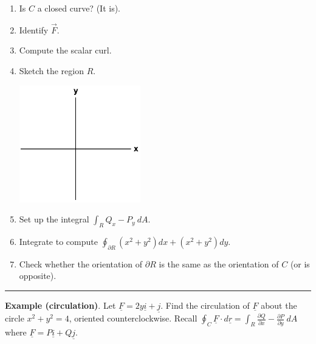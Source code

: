 \documentclass[12pt,letterpaper,noanswers]{exam}
\newcommand{\mb}[1]{\underline{#1}}
\begin{document}
\begin{enumerate}
    \item Is $C$ a closed curve?  (It is).
    \item Identify $\vec F$.
    \vspace{0.5in}
    
    \item Compute the scalar curl.
    \vspace{1in}
    
    \item Sketch the region $R$.
    
    \includegraphics[height=2in]{img/C02axes-2.png}
    
    \item Set up the integral $\int_R Q_x - P_y \ dA$.
    \vspace{1in}
    
    \item Integrate to compute $\oint_{\partial R} (x^2+y^2)dx + (x^2+y^2)dy$.
    \vspace{1.5in}
    
    \item Check whether the orientation of $\partial R$ is the same as the orientation of $C$ (or is opposite).
\end{enumerate}

\vspace{0.2cm}
\hrule
\vspace{0.2cm}


\noindent\textbf{Example (circulation)}.  Let $\mb F = 2y\mb i + \mb j$.  Find the circulation of $\mb F$ about the circle $x^2+y^2 = 4$, oriented counterclockwise.  Recall $\displaystyle\oint_C \mb F\cdot d\mb r = \int_R \frac{\partial Q}{\partial x} - \frac{\partial P}{\partial y}\ dA$ where $\mb F = P\mb i + Q\mb j$.


\vfill

\end{document}
